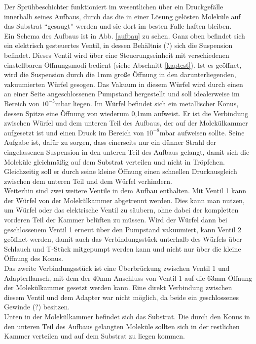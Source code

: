 Der Sprühbeschichter funktioniert im wesentlichen über ein Druckgefälle innerhalb seines Aufbaus, durch das
die in einer Lösung gelösten Moleküle auf das Substrat "`gesaugt"' werden und sie dort im besten
Falle haften bleiben. \\
Ein Schema des Aufbaus ist in Abb. \ref{aufbau} zu sehen. Ganz oben befindet sich ein elektrisch
gesteuertes Ventil, in dessen Behältnis (?) sich die Suspension befindet. Dieses Ventil wird über eine
Steuerungseinheit mit verschiedenen einstellbaren Öffnungsmodi bedient (siehe Abschnitt \ref{kaptest}). Ist es
geöffnet, wird die Suspension durch die 1mm große Öffnung in den darunterliegenden, vakuumierten Würfel
gesogen. Das Vakuum in diesem Würfel wird durch einen an einer Seite angeschlossenen Pumpstand hergestellt
und soll idealerweise im Bereich von $10^{-5}$mbar liegen. Im Würfel befindet sich ein metallischer
Konus, dessen Spitze eine Öffnung von wiederum 0,1mm aufweist. Er ist die Verbindung zwischen Würfel und dem
unteren Teil des Aufbaus, der auf der Molekülkammer aufgesetzt ist und einen Druck im Bereich von
$10^{-8}$mbar aufweisen sollte.  
Seine Aufgabe ist, dafür zu sorgen, dass einerseits nur ein dünner Strahl der eingelassenen Suspension in
den unteren Teil des Aufbaus gelangt, damit sich die Moleküle gleichmäßig auf dem Substrat verteilen und
nicht in Tröpfchen. Gleichzeitig soll er durch seine kleine Öffnung einen schnellen Druckausgleich zwischen
dem unteren Teil und dem Würfel verhindern. \\
Weiterhin sind zwei weitere Ventile in dem Aufbau enthalten. Mit Ventil 1 kann der Würfel von der
Molekülkammer abgetrennt werden. Dies kann man nutzen, um Würfel oder das elektrische Ventil zu säubern, ohne
dabei der kompletten vorderen Teil der Kammer belüften zu müssen. Wird der Würfel dann bei geschlossenem
Ventil 1 erneut über den Pumpstand vakuumiert, kann Ventil 2 geöffnet werden, damit auch das Verbindungsstück
unterhalb des Würfels über Schlauch und T-Stück mitgepumpt werden kann und nicht nur über die kleine Öffnung
des Konus.\\
Das zweite Verbindungsstück ist eine Überbrückung zwischen Ventil 1 und Adapterflansch, mit dem
der 40mm-Anschluss von Ventil 1 %
auf die 63mm-Öffnung der Molekülkammer gesetzt werden kann. Eine direkt Verbindung zwischen diesem
Ventil und dem Adapter war nicht möglich, da beide ein geschlossenes Gewinde (?) besitzen.\\
Unten in der Molekülkammer befindet sich das Substrat. Die durch den Konus in den unteren Teil des Aufbaus
gelangten Moleküle sollten sich in der restlichen Kammer verteilen und auf dem Substrat zu liegen kommen.

